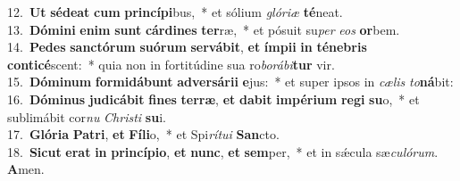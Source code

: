 {12.~}\textbf{Ut} \textbf{sé}\textbf{de}\textbf{at} \textbf{cum} \textbf{prin}\textbf{cí}\textbf{pi}bus,~* et sólium \textit{gló}\textit{ri}\textit{æ} \textbf{té}neat.\\
{13.~}\textbf{Dó}\textbf{mi}\textbf{ni} \textbf{e}\textbf{nim} \textbf{sunt} \textbf{cár}\textbf{di}\textbf{nes} \textbf{ter}ræ,~* et pósuit su\textit{per} \textit{e}\textit{os} \textbf{or}bem.\\
{14.~}\textbf{Pe}\textbf{des} \textbf{san}\textbf{ctó}\textbf{rum} \textbf{su}\textbf{ó}\textbf{rum} \textbf{ser}\textbf{vá}\textbf{bit}, \textbf{et} \textbf{ím}\textbf{pi}\textbf{i} \textbf{in} \textbf{té}\textbf{ne}\textbf{bris} \textbf{con}\textbf{ti}\textbf{cé}scent:~* quia non in fortitúdine sua ro\textit{bo}\textit{rá}\textit{bi}\textbf{tur} vir.\\
{15.~}\textbf{Dó}\textbf{mi}\textbf{num} \textbf{for}\textbf{mi}\textbf{dá}\textbf{bunt} \textbf{ad}\textbf{ver}\textbf{sá}\textbf{ri}\textbf{i} \textbf{e}jus:~* et super ipsos in \textit{cæ}\textit{lis} \textit{to}\textbf{ná}bit:\\
{16.~}\textbf{Dó}\textbf{mi}\textbf{nus} \textbf{ju}\textbf{di}\textbf{cá}\textbf{bit} \textbf{fi}\textbf{nes} \textbf{ter}\textbf{ræ}, \textbf{et} \textbf{da}\textbf{bit} \textbf{im}\textbf{pé}\textbf{ri}\textbf{um} \textbf{re}\textbf{gi} \textbf{su}o,~* et sublimábit cor\textit{nu} \textit{Chri}\textit{sti} \textbf{su}i.\\
{17.~}\textbf{Gló}\textbf{ri}\textbf{a} \textbf{Pa}\textbf{tri}, \textbf{et} \textbf{Fí}\textbf{li}o,~* et Spi\textit{rí}\textit{tu}\textit{i} \textbf{San}cto.\\
{18.~}\textbf{Si}\textbf{cut} \textbf{e}\textbf{rat} \textbf{in} \textbf{prin}\textbf{cí}\textbf{pi}\textbf{o}, \textbf{et} \textbf{nunc}, \textbf{et} \textbf{sem}per,~* et in sǽcula sæ\textit{cu}\textit{ló}\textit{rum}. \textbf{A}men.\\
